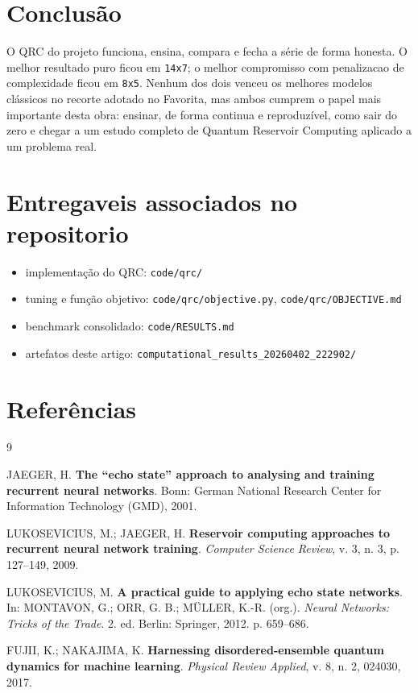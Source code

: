 \documentclass[12pt]{article}
\providecommand{\tightlist}{%
              \setlength{\itemsep}{0pt}\setlength{\parskip}{0pt}}
\begin{document}
\section{Conclusão}\label{11-conclusuxe3o}

O QRC do projeto funciona, ensina, compara e fecha a série de forma honesta. O melhor resultado puro ficou em \texttt{14x7}; o melhor compromisso com penalizacao de complexidade ficou em \texttt{8x5}. Nenhum dos dois venceu os melhores modelos clássicos no recorte adotado no Favorita, mas ambos cumprem o papel mais importante desta obra: ensinar, de forma continua e reproduzível, como sair do zero e chegar a um estudo completo de Quantum Reservoir Computing aplicado a um problema real.

\section*{Entregaveis associados no repositorio}\label{entregaveis-associados-no-repositorio}

\begin{itemize}
\tightlist
\item
  implementação do QRC: \texttt{code/qrc/}
\item
  tuning e função objetivo: \texttt{code/qrc/objective.py}, \texttt{code/qrc/OBJECTIVE.md}
\item
  benchmark consolidado: \texttt{code/RESULTS.md}
\item
  artefatos deste artigo: \texttt{computational\_results\_20260402\_222902/}
\end{itemize}

\section{Referências}\label{referencias}

\begin{thebibliography}{9}

JAEGER, H. \textbf{The ``echo state'' approach to analysing and training recurrent neural networks}. Bonn: German National Research Center for Information Technology (GMD), 2001.

LUKOSEVICIUS, M.; JAEGER, H. \textbf{Reservoir computing approaches to recurrent neural network training}. \emph{Computer Science Review}, v. 3, n. 3, p. 127--149, 2009.

LUKOSEVICIUS, M. \textbf{A practical guide to applying echo state networks}. In: MONTAVON, G.; ORR, G. B.; MÜLLER, K.-R. (org.). \emph{Neural Networks: Tricks of the Trade}. 2. ed. Berlin: Springer, 2012. p. 659--686.

FUJII, K.; NAKAJIMA, K. \textbf{Harnessing disordered-ensemble quantum dynamics for machine learning}. \emph{Physical Review Applied}, v. 8, n. 2, 024030, 2017.

\end{thebibliography}

            
\end{document}
